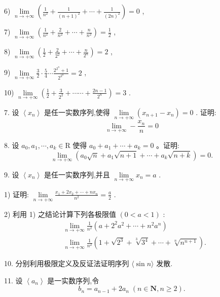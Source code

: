 6) $\mathop{\lim }\limits_{{n \rightarrow   + \infty }}\left( {\frac{1}{{n}^{2}} + \frac{1}{{\left( n + 1\right) }^{2}} + \cdots  + \frac{1}{{\left( 2n\right) }^{2}}}\right)  = 0$ ,

7) $\mathop{\lim }\limits_{{n \rightarrow   + \infty }}\left( {\frac{1}{{n}^{2}} + \frac{2}{{n}^{2}} + \cdots  + \frac{n}{{n}^{2}}}\right)  = \frac{1}{2}$ ,

8) $\mathop{\lim }\limits_{{n \rightarrow   + \infty }}\left( {\frac{1}{2} + \frac{2}{{2}^{2}} + \cdots  + \frac{n}{{2}^{n}}}\right)  = 2$ ,

9) $\mathop{\lim }\limits_{{n \rightarrow   + \infty }}\frac{3}{2} \cdot  \frac{5}{4}\cdots \frac{{2}^{{2}^{n}} + 1}{{2}^{{2}^{n}}} = 2$ ,

10) $\mathop{\lim }\limits_{{n \rightarrow   + \infty }}\left( {\frac{1}{2} + \frac{3}{{2}^{2}} + \cdots \cdots  + \frac{{2n} - 1}{{2}^{n}}}\right)  = 3$ .

7. 设 $\left\langle  {x}_{n}\right\rangle$ 是任一实数序列,使得 $\mathop{\lim }\limits_{{n \rightarrow   + \infty }}\left( {{x}_{n + 1} - {x}_{n}}\right)  = 0$ . 证明:
$$\mathop{\lim }\limits_{{n \rightarrow   + \infty }} - \frac{{x}_{n}}{n} = 0$$

8. 设 ${a}_{0},{a}_{1},\cdots ,{a}_{k} \in  \mathrm{R}$ 使得 ${a}_{0} + {a}_{1} + \cdots  + {a}_{k} = 0$ 。证明:
$$\mathop{\lim }\limits_{{n \rightarrow   + \infty }}\left( {{a}_{0}\sqrt{n} + {a}_{1}\sqrt{n + 1} + \cdots  + {a}_{k}\sqrt{n + k}}\right)  = 0.$$

9. 设 $\left\langle  {x}_{n}\right\rangle$ 是任一实数序列,并且 $\mathop{\lim }\limits_{{n \rightarrow   + \infty }}{x}_{n} = a$ .

1) 证明: $\mathop{\lim }\limits_{{n \rightarrow   + \infty }}\frac{{x}_{1} + 2{x}_{2} + \cdots  + n{x}_{n}}{{n}^{2}} = \frac{a}{2}$ .

2) 利用 1) 之结论计算下列各极限值 $\left( {0 < a < 1}\right)$ :
\begin{align*}
	&\mathop{\lim }\limits_{{n \rightarrow   + \infty }}\frac{1}{{n}^{2}}\left( {a + {2}^{2}{a}^{2} + \cdots  + {n}^{2}{a}^{n}}\right)\\
	&\mathop{\lim }\limits_{{n \rightarrow   + \infty }}\frac{1}{{n}^{2}}\left( {1 + \sqrt{{2}^{3}} + \sqrt[3]{{3}^{4}} + \cdots  + \sqrt[n]{{n}^{n + 1}}}\right) .
\end{align*}

10. 分别利用极限定义及反证法证明序列 $\langle \sin n\rangle$ 发散.

11. 设 $\left\langle  {a}_{n}\right\rangle$ 是一实数序列,令
$${b}_{n} = {a}_{n - 1} + 2{a}_{n}\;\left( {n \in  \mathbf{N},n \geq  2}\right) .$$

